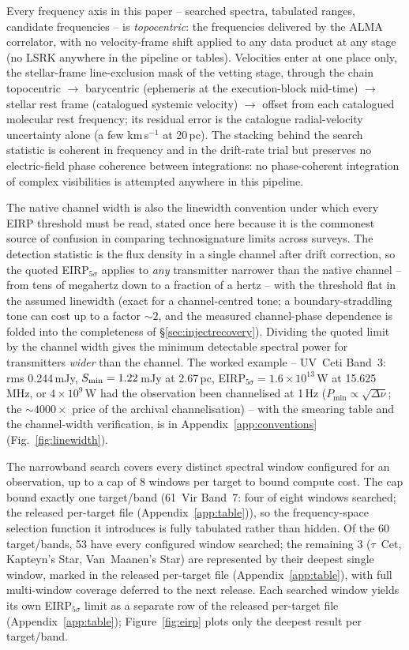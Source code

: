 \documentclass{openjournal}
\begin{document}
Every frequency axis in this paper -- searched spectra, tabulated
ranges, candidate frequencies -- is \emph{topocentric}: the
frequencies delivered by the ALMA correlator, with no velocity-frame
shift applied to any data product at any stage (no LSRK anywhere in
the pipeline or tables). Velocities enter at one place only, the
stellar-frame line-exclusion mask of the vetting stage, through the
chain topocentric $\rightarrow$ barycentric (ephemeris at the
execution-block mid-time) $\rightarrow$ stellar rest frame
(catalogued systemic velocity) $\rightarrow$ offset from each
catalogued molecular rest frequency; its residual error is the
catalogue radial-velocity uncertainty alone (a few km\,s$^{-1}$ at
20\,pc). The stacking behind the search statistic is
coherent in frequency and in the drift-rate trial but preserves no
electric-field phase coherence between integrations: no
phase-coherent integration of complex visibilities is attempted
anywhere in this pipeline.

The native channel width is also the linewidth convention under which
every EIRP threshold must be read, stated once here because it is the
commonest source of confusion in comparing technosignature limits
across surveys. The detection statistic is the flux density in a
single channel after drift correction, so the quoted
EIRP$_{5\sigma}$ applies to \emph{any} transmitter narrower than the
native channel -- from tens of megahertz down to a fraction of a
hertz -- with the threshold flat in the assumed linewidth (exact for
a channel-centred tone; a boundary-straddling tone can cost up to a
factor ${\sim}2$, and the measured channel-phase
dependence is folded into the completeness of
\S\ref{sec:injectrecovery}). Dividing the quoted limit by the channel
width gives the minimum detectable spectral power for transmitters
\emph{wider} than the channel. The worked example -- UV~Ceti Band~3:
rms 0.244\,mJy, $S_{\rm min}=1.22$\,mJy at 2.67\,pc,
EIRP$_{5\sigma}=1.6\times10^{13}$\,W at 15.625\,MHz, or
$4\times10^{9}$\,W had the observation been channelised at 1\,Hz
($P_{\min}\propto\sqrt{\Delta\nu}$; the ${\sim}4000\times$ price of
the archival channelisation) -- with the smearing table and the
channel-width verification, is in Appendix~\ref{app:conventions}
(Fig.~\ref{fig:linewidth}).

The narrowband search covers every distinct spectral window
configured for an observation, up to a cap of 8 windows per target to
bound compute cost. The cap bound exactly one target/band (61~Vir
Band~7: four of eight windows searched; the released per-target file (Appendix~\ref{app:table})), so the
frequency-space selection function it introduces is fully tabulated
rather than hidden. Of the 60 target/bands, 53 have every configured
window searched; the remaining 3 ($\tau$~Cet, Kapteyn's Star,
Van~Maanen's Star) are represented by their deepest single window,
marked in the released per-target file (Appendix~\ref{app:table}), with full multi-window coverage
deferred to the next release. Each searched window yields its own
EIRP$_{5\sigma}$ limit as a separate row of the released per-target file (Appendix~\ref{app:table});
Figure~\ref{fig:eirp} plots only the deepest result per target/band.
\end{document}

